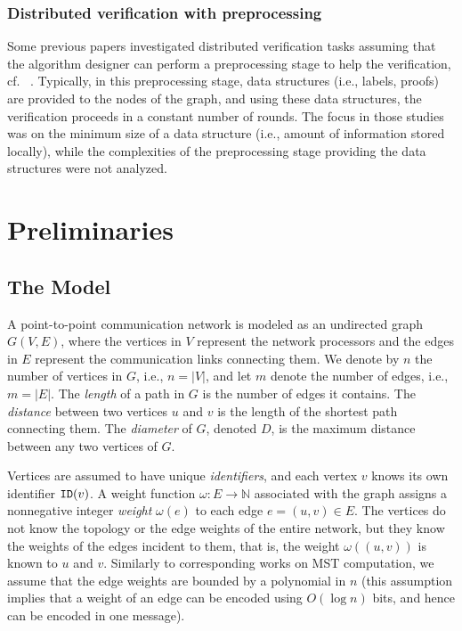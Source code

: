 \documentclass[11pt,letter]{article}
\def\ID{\mbox{\tt ID}}
\begin{document}
\subsubsection{Distributed verification with preprocessing}\label{preprocessing}

Some previous 
papers investigated distributed verification tasks assuming that the algorithm 
designer can perform a preprocessing stage to help the verification, 
cf. ~\cite{AKY97,APV,silent,KK07,KKP10}. 
Typically, in this preprocessing stage, data structures (i.e., labels, proofs) 
are provided to the nodes of the graph, and using these data structures, 
the verification proceeds in a constant number of rounds. The focus in those 
studies was on the  minimum size of a data structure (i.e., amount of 
information stored locally), while the complexities of the preprocessing stage 
providing the data structures were not analyzed. 

 \section{Preliminaries}

\subsection{The Model}

A point-to-point communication network is modeled as an undirected
graph $G(V,E)$,
where the vertices in $V$ represent the network processors and the
edges in $E$ represent the communication links connecting them. We denote by $n$ the number of vertices in $G$, i.e., $n=|V|$, and let $m$ denote the number of edges, i.e., $m=|E|$.
The {\em length} of a path in $G$  is the number of edges it
contains. The {\em distance} between two vertices $u$ and $v$ is
 the length of the shortest path connecting them. 
The {\em diameter} of $G$, denoted $D$, is the maximum distance
between any two vertices of $G$.

Vertices are assumed to have unique {\em identifiers}, 
and each vertex $v$ knows its own identifier $\ID(v)$.
A weight function $\omega: E \rightarrow \mathbb{N}$ associated with the
graph assigns a nonnegative integer {\em weight} $\omega(e)$ to each edge
$e=(u,v)\in E$.  The vertices do not know the topology or the edge weights of the
entire network, but they  know the weights of the edges incident to them, that is, the weight $\omega((u,v))$ is known to  $u$ and $v$. 
Similarly to corresponding works on MST computation,  we assume that the edge weights are bounded by a polynomial in $n$ 
(this assumption implies that a weight of an edge can be encoded using $O(\log n)$ bits, and hence can be encoded in one message). 
 
\end{document}
